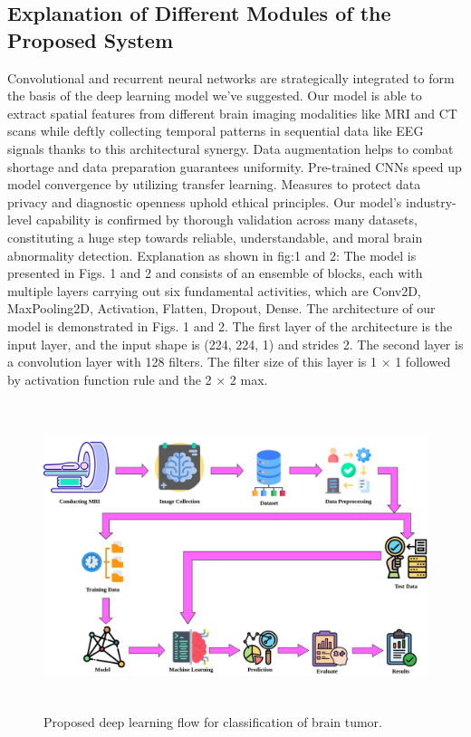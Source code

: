 \subsection{Explanation of Different Modules of the Proposed System}
Convolutional and recurrent neural networks are strategically integrated to form the basis of the deep learning model we've suggested. Our model is able to extract spatial features from different brain imaging modalities like MRI and CT scans while deftly collecting temporal patterns in sequential data like EEG signals thanks to this architectural synergy. Data augmentation helps to combat shortage and data preparation guarantees uniformity. Pre-trained CNNs speed up model convergence by utilizing transfer learning. Measures to protect data privacy and diagnostic openness uphold ethical principles. Our model's industry-level capability is confirmed by thorough validation across many datasets, constituting a huge step towards reliable, understandable, and moral brain abnormality detection. Explanation as shown in fig:1 and 2: The model is presented in Figs. 1 and 2 and consists of an ensemble of blocks, each with multiple layers carrying out six fundamental activities, which are Conv2D, MaxPooling2D, Activation, Flatten, Dropout, Dense. The architecture of our model is demonstrated in Figs. 1 and 2. The first layer of the architecture is the input layer, and the input shape is (224, 224, 1) and strides 2. The second layer is a convolution layer with 128 filters. The filter size of this layer is 1 × 1 followed by activation function rule and the 2 × 2 max.
\begin{figure}[h!]
    \centering
    \includegraphics[height=9cm]{img/flowclassification.jpeg}
    \caption{Proposed deep learning flow for classification of brain tumor.}
    \label{fig:classificationImg}
\end{figure}

